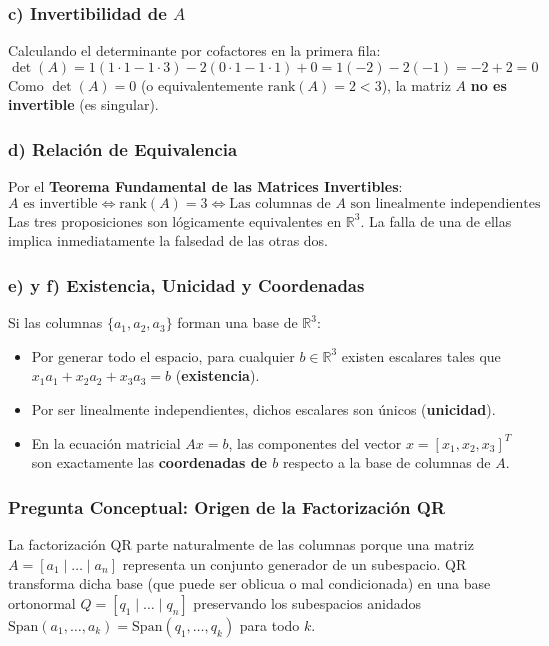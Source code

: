 \documentclass[11pt,a4paper]{article}
\theoremstyle{definition}
\theoremstyle{remark}
\begin{document}
\subsubsection{c) Invertibilidad de $A$}
Calculando el determinante por cofactores en la primera fila:
\begin{equation}
    \det(A) = 1(1\cdot 1 - 1\cdot 3) - 2(0\cdot 1 - 1\cdot 1) + 0 = 1(-2) - 2(-1) = -2 + 2 = 0
\end{equation}
Como $\det(A) = 0$ (o equivalentemente $\text{rank}(A) = 2 < 3$), la matriz $A$ \textbf{no es invertible} (es singular).

\subsubsection{d) Relación de Equivalencia}
Por el \textbf{Teorema Fundamental de las Matrices Invertibles}:
\begin{equation}
    A \text{ es invertible} \iff \text{rank}(A) = 3 \iff \text{Las columnas de } A \text{ son linealmente independientes}
\end{equation}
Las tres proposiciones son lógicamente equivalentes en $\mathbb{R}^3$. La falla de una de ellas implica inmediatamente la falsedad de las otras dos.

\subsubsection{e) y f) Existencia, Unicidad y Coordenadas}
Si las columnas $\{a_1, a_2, a_3\}$ forman una base de $\mathbb{R}^3$:
\begin{itemize}[leftmargin=*]
    \item Por generar todo el espacio, para cualquier $b \in \mathbb{R}^3$ existen escalares tales que $x_1 a_1 + x_2 a_2 + x_3 a_3 = b$ (\textbf{existencia}).
    \item Por ser linealmente independientes, dichos escalares son únicos (\textbf{unicidad}).
    \item En la ecuación matricial $Ax = b$, las componentes del vector $x = [x_1, x_2, x_3]^T$ son exactamente las \textbf{coordenadas de $b$} respecto a la base de columnas de $A$.
\end{itemize}

\subsubsection{Pregunta Conceptual: Origen de la Factorización QR}
La factorización QR parte naturalmente de las columnas porque una matriz $A = [a_1 \mid \dots \mid a_n]$ representa un conjunto generador de un subespacio. QR transforma dicha base (que puede ser oblicua o mal condicionada) en una base ortonormal $Q = [q_1 \mid \dots \mid q_n]$ preservando los subespacios anidados $\text{Span}(a_1, \dots, a_k) = \text{Span}(q_1, \dots, q_k)$ para todo $k$.
\end{document}
